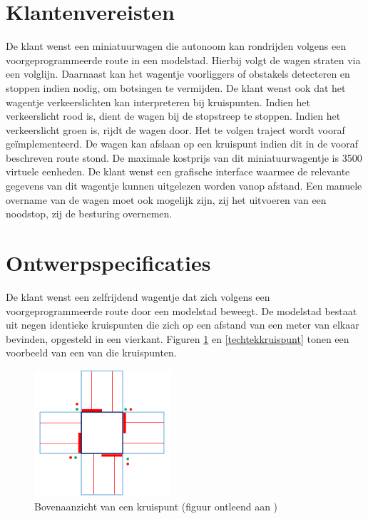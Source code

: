 \documentclass[a4paper,kulak]{kulakarticle}
\begin{document}
\begin{appendices}
\begin{table}[h!]
\begin{tabular}{|l|r|r|r|}
	\end{tabular}
\end{table}
\section{Klantenvereisten}
	\renewcommand\refname{} %

De klant wenst een miniatuurwagen die autonoom kan rondrijden volgens een voorgeprogrammeerde route in een modelstad. Hierbij volgt de wagen straten via een volglijn. Daarnaast kan het wagentje voorliggers of obstakels detecteren en stoppen indien nodig, om botsingen te vermijden. De klant wenst ook dat het wagentje verkeerslichten kan interpreteren bij kruispunten. Indien het verkeerslicht rood is, dient de wagen bij de stopstreep te stoppen. Indien het verkeerslicht groen is, rijdt de wagen door.  Het te volgen traject wordt vooraf geïmplementeerd. De wagen kan afslaan op een kruispunt indien dit in de vooraf beschreven route stond. De maximale kostprijs van dit miniatuurwagentje is 3500 virtuele eenheden. De klant wenst een grafische interface waarmee de relevante gegevens van dit wagentje kunnen uitgelezen worden vanop afstand. Een manuele overname van de wagen moet ook mogelijk zijn, zij het uitvoeren van een noodstop, zij de besturing overnemen.

\section{Ontwerpspecificaties}
\renewcommand\refname{} %

De klant wenst een zelfrijdend wagentje dat zich volgens een voorgeprogrammeerde route door een modelstad beweegt. De modelstad bestaat uit negen identieke kruispunten die zich op een afstand van een meter van elkaar bevinden, opgesteld in een vierkant. Figuren \ref{kruispunt} en \ref{techtekkruispunt} tonen een voorbeeld van een van die kruispunten.

\begin{figure}[h]
	\centering
	\includegraphics[width=0.45\textwidth]{kruispunt.png}
	\caption{Bovenaanzicht van een kruispunt (figuur ontleend aan \cite{opgave})}
	\label{kruispunt}
\end{figure}



\end{appendices}
\end{document}
